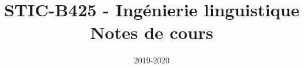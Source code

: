 
\graphicspath{{images/}}

\usepackage{eurosym}
\usepackage{tikz, tikz-qtree}
\usetikzlibrary{positioning}

\title{STIC-B425 - Ingénierie linguistique\\Notes de cours}
\date{2019-2020}



\maketitle
\setcounter{tocdepth}{2}
\tableofcontents
\newpage


\newpage

\newpage

\newpage

\newpage

\newpage

\newpage

\newpage



